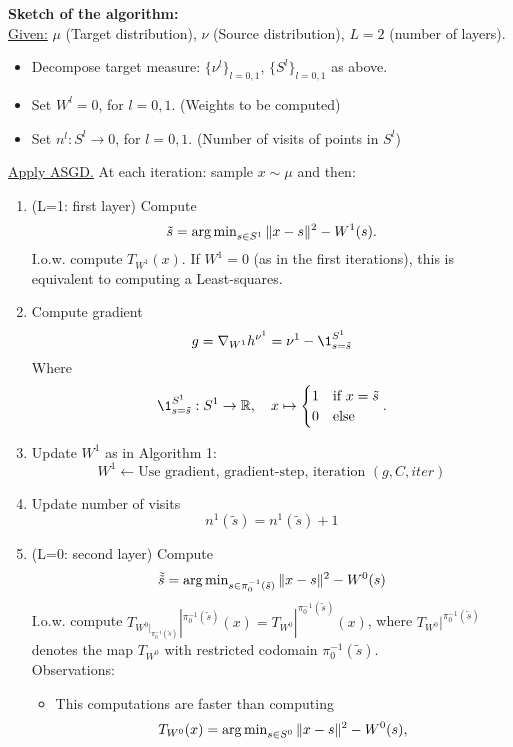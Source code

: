 \documentclass[
     12pt,         %
     a4paper,      %
     BCOR=10mm,     %
     DIV=14,        %
     ]{scrreprt}
\begin{document}
\textbf{Sketch of the algorithm:}\\[8pt]
\underline{Given:} $\mu$ (Target distribution), $\nu$ (Source distribution), $L=2$ (number of layers). 
\begin{itemize}
    \item Decompose target measure: $\{\nu^l\}_{l=0,1}$, $\{S^l\}_{l=0,1}$ as above.
    \item Set $W^l = 0$,  for $l=0,1$. (Weights to be computed)
    \item Set $n^l: S^l \to 0 $,  for $l=0,1$. (Number of visits of points in $S^l$)
\end{itemize}
\underline{Apply ASGD.}  At each iteration: sample $x \sim \mu$ and then:
\begin{enumerate}
    \item (L=1: first layer) Compute
        \[\tilde s = \operatorname{arg\,min}_{s \in S^{1}} \| x - s \|^2 - W^1(s) .\]
        I.o.w. compute $T_{W^1}(x)$. If $W^1=0$ (as in the first iterations), this is equivalent to computing a Least-squares. 
    \item Compute gradient 
        \[g = \nabla_{W^1} h^{\nu^1} = \nu^1 - \1_{s=\tilde s}^{S^1} \]
        Where \[\1_{s=\tilde s}^{S^1}: S^1 \to \R, \quad     
            x \mapsto
            \begin{cases} 
                1 &\mbox{if } x=\tilde s \\
                0 & \mbox{else } 
            \end{cases} . \]
    \item Update $W^1$ as in Algorithm 1: 
        \[W^1 \longleftarrow \text{Use gradient, gradient-step, iteration } (g, C, iter) \]
    \item Update number of visits 
        \[n^1(\tilde s) = n^1(\tilde s) + 1 \]
    \item (L=0: second layer) Compute
        \[\tilde {\tilde{s}} = \operatorname{arg\,min}_{s \in \pi_0^{-1}(\tilde s)} \| x - s \|^2 - W^0(s) \]
        I.o.w. compute $T_{W^0|_{\pi_0^{-1}(\tilde s)}}|^{\pi_0^{-1}(\tilde s)}(x) = T_{W^0}|^{\pi_0^{-1}(\tilde s)}(x)$, 
        where $T_{W^0}|^{\pi_0^{-1}(\tilde s)}$ denotes the map $T_{W^0}$ 
        with restricted codomain ${\pi_0^{-1}(\tilde s)}$. \\ 
        Observations: 
        \begin{itemize}
            \item This computations are faster than computing
                \[T_{W^0}(x) = \operatorname{arg\,min}_{s \in S^0} \| x - s \|^2 - W^0(s), \]

\end{itemize}
\end{enumerate}
\end{document}
